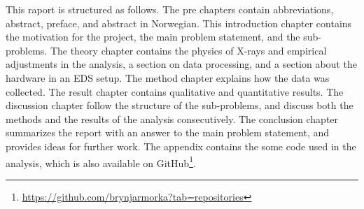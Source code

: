 This raport is structured as follows.
The pre chapters contain abbreviations, abstract, preface, and abstract in Norwegian.
This introduction chapter contains the motivation for the project, the main problem statement, and the sub-problems.
The theory chapter contains the physics of X-rays and empirical adjustments in the analysis, a section on data processing, and a section about the hardware in an EDS setup.
The method chapter explains how the data was collected.
The result chapter contains qualitative and quantitative results.
The discussion chapter follow the structure of the sub-problems, and discuss both the methods and the results of the analysis consecutively.
The conclusion chapter summarizes the report with an answer to the main problem statement, and provides ideas for further work.
The appendix contains the some code used in the analysis, which is also available on GitHub\footnote{\url{https://github.com/brynjarmorka?tab=repositories}}.